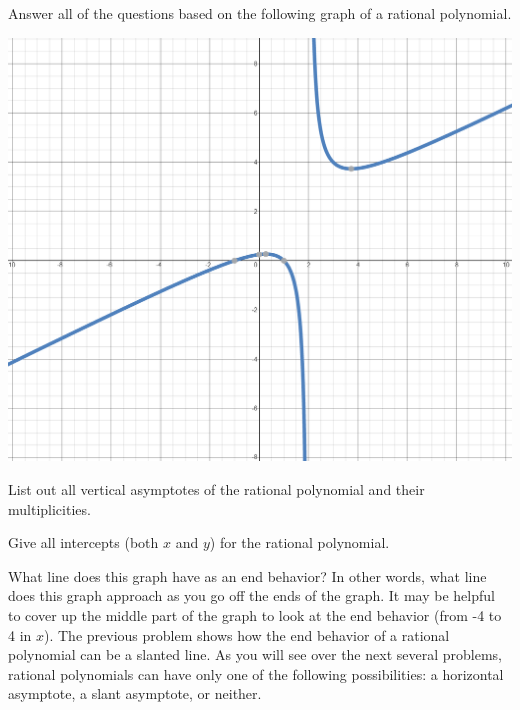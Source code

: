 \bq Answer all of the questions based on the following graph of a rational polynomial.
\begin{center} \includegraphics[scale=.45]{r2.png} \end{center}
\be
\item List out all vertical asymptotes of the rational polynomial and their multiplicities.
\item Give all intercepts (both $x$ and $y$) for the rational polynomial.
\item What line does this graph have as an end behavior? In other words, what line does this graph approach as you go off the ends of the graph. It may be helpful to cover up the middle part of the graph to look at the end behavior (from -4 to 4 in $x$).
\ee
\eq
The previous problem shows how the end behavior of a rational polynomial can be a slanted line. As you will see over the next several problems, rational polynomials can have only one of the following possibilities: a horizontal asymptote, a slant asymptote, or neither.

